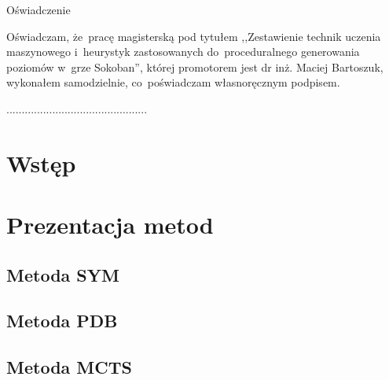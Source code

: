 \documentclass[a4paper,11pt,twoside]{report}
\makeatletter
\def\cleardoublepage{\clearpage\if@twoside
\ifodd\c@page\else\hbox{}\thispagestyle{empty}\newpage
\if@twocolumn\hbox{}\newpage\fi\fi\fi}
\theoremstyle{definition}
\newcommand{\tytul}{Zestawienie technik uczenia maszynowego i~heurystyk zastosowanych do~proceduralnego generowania poziomów w~grze Sokoban}
\newcommand{\supervisor}{dr inż. Maciej Bartoszuk}
\makeatother
\begin{document}
\begin{center}
Oświadczenie
\end{center}

\indent Oświadczam, że~pracę magisterską pod tytułem ,,\tytul '', której promotorem jest \supervisor, wykonałem samodzielnie, co~poświadczam własnoręcznym podpisem.
\vspace{2cm}

\begin{flushright}
  \begin{minipage}{50mm}
    \begin{center}
      ..............................................

    \end{center}
  \end{minipage}
\end{flushright}

\thispagestyle{empty}
\newpage

\null\thispagestyle{empty}\newpage


\tableofcontents
\thispagestyle{empty}

\null\thispagestyle{empty}\newpage
\pagestyle{fancy}
\setcounter{page}{11} %

\chapter{Wstęp} \label{chap:wstep}


\chapter{Prezentacja metod} \label{chap:prezentacja_metod}

\cleardoublepage
\section{Metoda SYM}

\cleardoublepage
\section{Metoda PDB}

\cleardoublepage
\section{Metoda MCTS}

\cleardoublepage
\end{document}
